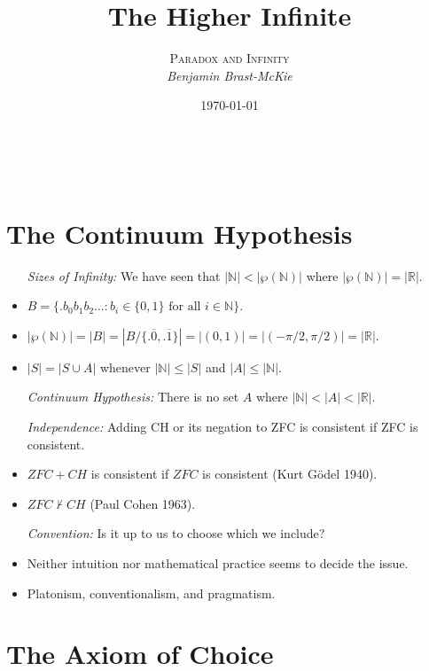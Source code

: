 \documentclass[a4paper, 11pt]{article} %
\title{\textbf{The Higher Infinite}} %
\author{\textsc{Paradox and Infinity}\\ \em Benjamin Brast-McKie} %
\date{\today} %
\makeatletter
\newcommand{\set}[1]{\lbrace#1\rbrace} %
\newcommand{\abs}[1]{|#1|} %
\newcommand{\N}{\mathbb{N}}
\newcommand{\R}{\mathbb{R}}
\renewcommand{\maketitle}{ %
\begin{flushright} %
{\LARGE\@title} %

\vspace{10pt} %

{\@author} %
\\\@date %

\vspace{0pt} %
\end{flushright}
}
\makeatother
\begin{document}
\maketitle %

\thispagestyle{empty}



\section*{The Continuum Hypothesis}

\begin{itemize}
  \item[\it Sizes of Infinity:] We have seen that $\abs{\N} < \abs{\wp(\N)}$ where $\abs{\wp(\N)} = \abs{\R}$. 
    \item $B=\set{.b_0b_1b_2\ldots : b_i \in \set{0, 1} \text{ for all } i \in \N}$.
    \item $\abs{\wp(\N)} = \abs{B} = \abs{B/\set{.\overline{0},.\overline{1}}} = \abs{(0,1)} = \abs{(-\pi/2,\pi/2)} = \abs{\R}$.
    \item $\abs{S} = \abs{S \cup A}$ whenever $\abs{\N} \leq \abs{S}$ and $\abs{A} \leq \abs{\N}$.
  \item[\it Continuum Hypothesis:] There is no set $A$ where $\abs{\N} < \abs{A} < \abs{\R}$.
  \item[\it Independence:] Adding CH or its negation to ZFC is consistent if ZFC is consistent.
  \item $ZFC+CH$ is consistent if $ZFC$ is consistent (Kurt G\"{o}del 1940).
  \item $ZFC \nvdash CH$ (Paul Cohen 1963).
  \item[\it Convention:] Is it up to us to choose which we include?
  \item Neither intuition nor mathematical practice seems to decide the issue.
  \item Platonism, conventionalism, and pragmatism.
\end{itemize}



\section*{The Axiom of Choice}
\end{document}

